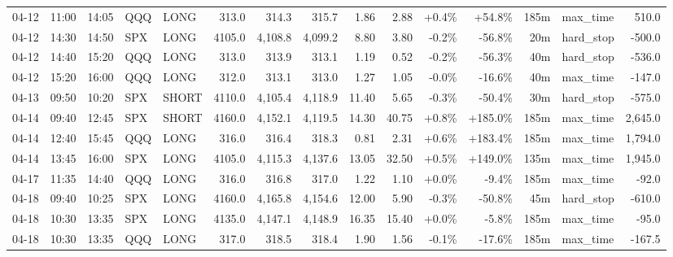 \documentclass[11pt,a4paper,twoside]{article}
\begin{document}
\begin{landscape}
\begin{center}
\begin{longtable}{>{\color{txtmain}}l l l l l r r r r r r r r >{\color{txtmain}}l r}
04-12 & 11:00 & 14:05 & QQQ & LONG & 313.0 & 314.3 & 315.7 & 1.86 & 2.88 & \textcolor{wingreen}{+0.4\%} & \textcolor{wingreen}{+54.8\%} & 185m & max\_time & \textcolor{wingreen}{510.0} \\
04-12 & 14:30 & 14:50 & SPX & LONG & 4105.0 & 4,108.8 & 4,099.2 & 8.80 & 3.80 & \textcolor{lossred}{-0.2\%} & \textcolor{lossred}{-56.8\%} & 20m & hard\_stop & \textcolor{lossred}{-500.0} \\
04-12 & 14:40 & 15:20 & QQQ & LONG & 313.0 & 313.9 & 313.1 & 1.19 & 0.52 & \textcolor{lossred}{-0.2\%} & \textcolor{lossred}{-56.3\%} & 40m & hard\_stop & \textcolor{lossred}{-536.0} \\
04-12 & 15:20 & 16:00 & QQQ & LONG & 312.0 & 313.1 & 313.0 & 1.27 & 1.05 & \textcolor{lossred}{-0.0\%} & \textcolor{lossred}{-16.6\%} & 40m & max\_time & \textcolor{lossred}{-147.0} \\
04-13 & 09:50 & 10:20 & SPX & SHORT & 4110.0 & 4,105.4 & 4,118.9 & 11.40 & 5.65 & \textcolor{lossred}{-0.3\%} & \textcolor{lossred}{-50.4\%} & 30m & hard\_stop & \textcolor{lossred}{-575.0} \\
04-14 & 09:40 & 12:45 & SPX & SHORT & 4160.0 & 4,152.1 & 4,119.5 & 14.30 & 40.75 & \textcolor{wingreen}{+0.8\%} & \textcolor{wingreen}{+185.0\%} & 185m & max\_time & \textcolor{wingreen}{2,645.0} \\
04-14 & 12:40 & 15:45 & QQQ & LONG & 316.0 & 316.4 & 318.3 & 0.81 & 2.31 & \textcolor{wingreen}{+0.6\%} & \textcolor{wingreen}{+183.4\%} & 185m & max\_time & \textcolor{wingreen}{1,794.0} \\
04-14 & 13:45 & 16:00 & SPX & LONG & 4105.0 & 4,115.3 & 4,137.6 & 13.05 & 32.50 & \textcolor{wingreen}{+0.5\%} & \textcolor{wingreen}{+149.0\%} & 135m & max\_time & \textcolor{wingreen}{1,945.0} \\
04-17 & 11:35 & 14:40 & QQQ & LONG & 316.0 & 316.8 & 317.0 & 1.22 & 1.10 & \textcolor{wingreen}{+0.0\%} & \textcolor{lossred}{-9.4\%} & 185m & max\_time & \textcolor{lossred}{-92.0} \\
04-18 & 09:40 & 10:25 & SPX & LONG & 4160.0 & 4,165.8 & 4,154.6 & 12.00 & 5.90 & \textcolor{lossred}{-0.3\%} & \textcolor{lossred}{-50.8\%} & 45m & hard\_stop & \textcolor{lossred}{-610.0} \\
04-18 & 10:30 & 13:35 & SPX & LONG & 4135.0 & 4,147.1 & 4,148.9 & 16.35 & 15.40 & \textcolor{wingreen}{+0.0\%} & \textcolor{lossred}{-5.8\%} & 185m & max\_time & \textcolor{lossred}{-95.0} \\
04-18 & 10:30 & 13:35 & QQQ & LONG & 317.0 & 318.5 & 318.4 & 1.90 & 1.56 & \textcolor{lossred}{-0.1\%} & \textcolor{lossred}{-17.6\%} & 185m & max\_time & \textcolor{lossred}{-167.5} \\

\end{longtable}
\end{center}
\end{landscape}
\end{document}
